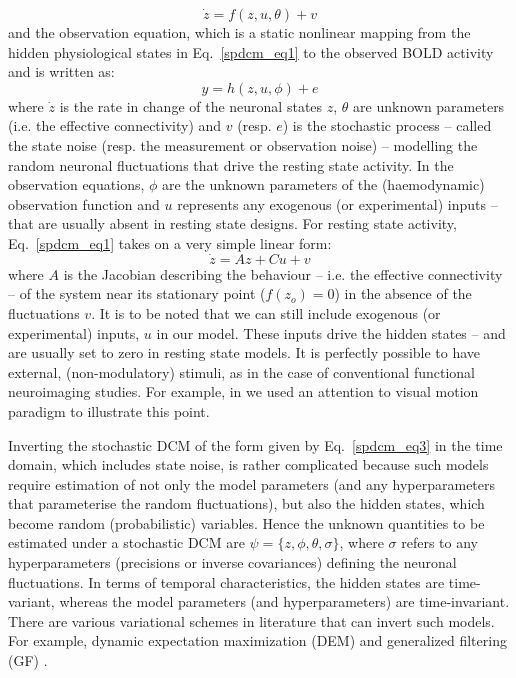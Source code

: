 \begin{equation}\label{spdcm_eq1}
\dot{z}= f(z,u,\theta)+ v
\end{equation}
and the observation equation, which is a static nonlinear mapping from the hidden physiological states in Eq.~\ref{spdcm_eq1} to the observed BOLD activity and is written as:
\begin{equation}\label{spdcm_eq2}
y= h(z,u,\phi)+ e
\end{equation}
where $\dot{z}$ is the rate in change of the neuronal states $z$, $\theta$ are unknown parameters (i.e. the effective connectivity) and $v$ (resp. $e$) is the stochastic process -- called the state noise (resp. the measurement or observation noise) -- modelling the random neuronal fluctuations that drive the resting state activity.  In the observation equations, $\phi$ are the unknown parameters of the (haemodynamic) observation function and $u$ represents any exogenous (or experimental) inputs -- that are usually absent in resting state designs. For resting state activity, Eq.~\ref{spdcm_eq1} takes on a very simple linear form:
\begin{equation}\label{spdcm_eq3}
\dot{z}= Az + Cu + v
\end{equation}
where $A$ is the Jacobian describing the behaviour -- i.e. the effective connectivity -- of the system near its stationary point ($f(z_{o})=0$) in the absence of the fluctuations $v$. It is to be noted that we can still include exogenous (or experimental) inputs, $u$  in our model. These inputs drive the hidden states -- and are usually set to zero in resting state models. It is perfectly possible to have external, (non-modulatory) stimuli, as in the case of conventional functional neuroimaging studies. For example, in \cite{dcm} we used an attention to visual motion paradigm to illustrate this point.

Inverting the stochastic DCM of the form given by Eq.~\ref{spdcm_eq3} in the time domain, which includes state noise, is rather complicated because such models require estimation of not only the model parameters (and any hyperparameters that parameterise the random fluctuations), but also the hidden states, which become random (probabilistic) variables. Hence the unknown quantities to be estimated under a stochastic DCM are  $\psi=\{z,\phi,\theta,\sigma\}$, where $\sigma$ refers to any hyperparameters (precisions or inverse covariances) defining the neuronal fluctuations. In terms of temporal characteristics, the hidden states are time-variant, whereas the model parameters (and hyperparameters) are time-invariant. There are various variational schemes in literature that can invert such models. For example, dynamic expectation maximization (DEM) \cite{karl_DEM} and generalized filtering (GF) \cite{karl_generalised_filtering}.


